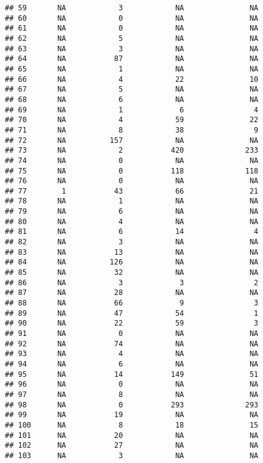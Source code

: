 \documentclass[
  english,
  man]{apa6}
\begin{document}
\begin{verbatim}
## 59       NA            3            NA               NA
## 60       NA            0            NA               NA
## 61       NA            0            NA               NA
## 62       NA            5            NA               NA
## 63       NA            3            NA               NA
## 64       NA           87            NA               NA
## 65       NA            1            NA               NA
## 66       NA            4            22               10
## 67       NA            5            NA               NA
## 68       NA            6            NA               NA
## 69       NA            1             6                4
## 70       NA            4            59               22
## 71       NA            8            38                9
## 72       NA          157            NA               NA
## 73       NA            2           420              233
## 74       NA            0            NA               NA
## 75       NA            0           118              118
## 76       NA            0            NA               NA
## 77        1           43            66               21
## 78       NA            1            NA               NA
## 79       NA            6            NA               NA
## 80       NA            4            NA               NA
## 81       NA            6            14                4
## 82       NA            3            NA               NA
## 83       NA           13            NA               NA
## 84       NA          126            NA               NA
## 85       NA           32            NA               NA
## 86       NA            3             3                2
## 87       NA           28            NA               NA
## 88       NA           66             9                3
## 89       NA           47            54                1
## 90       NA           22            59                3
## 91       NA            0            NA               NA
## 92       NA           74            NA               NA
## 93       NA            4            NA               NA
## 94       NA            6            NA               NA
## 95       NA           14           149               51
## 96       NA            0            NA               NA
## 97       NA            8            NA               NA
## 98       NA            0           293              293
## 99       NA           19            NA               NA
## 100      NA            8            18               15
## 101      NA           20            NA               NA
## 102      NA           27            NA               NA
## 103      NA            3            NA               NA

\end{verbatim}
\end{document}
